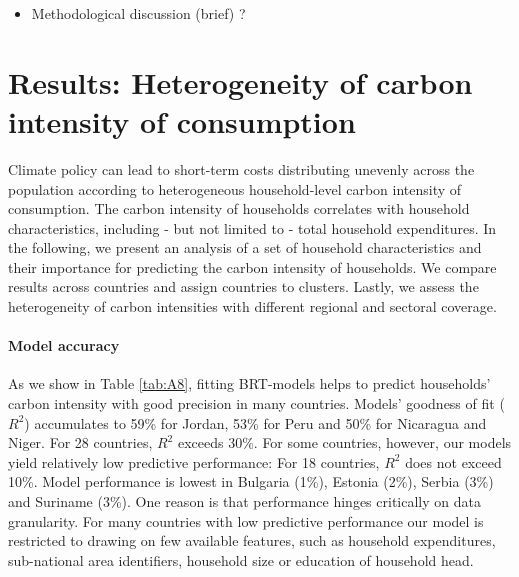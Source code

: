 \documentclass[12pt, a4paper]{article}
\begin{document}
\begin{itemize}
    \item Methodological discussion (brief) ?
\end{itemize}

\clearpage

\section{Results: Heterogeneity of carbon intensity of consumption} \label{sec:results}

Climate policy can lead to short-term costs distributing unevenly across the population according to heterogeneous household-level carbon intensity of consumption. The carbon intensity of households correlates with household characteristics, including - but not limited to - total household expenditures. In the following, we present an analysis of a set of household characteristics and their importance for predicting the carbon intensity of households. We compare results across countries and assign countries to clusters. Lastly, we assess the heterogeneity of carbon intensities with different regional and sectoral coverage.

\paragraph{Model accuracy} As we show in Table \ref{tab:A8}, fitting BRT-models helps to predict households' carbon intensity with good precision in many countries. Models' goodness of fit ($R^{2}$) accumulates to 59\% for Jordan, 53\% for Peru and 50\% for Nicaragua and Niger. For 28 countries, $R^{2}$ exceeds 30\%. For some countries, however, our models yield relatively low predictive performance: For 18 countries, $R^{2}$ does not exceed 10\%. Model performance is lowest in Bulgaria (1\%), Estonia (2\%), Serbia (3\%) and Suriname (3\%). One reason is that performance hinges critically on data granularity. For many countries with low predictive performance our model is restricted to drawing on few available features, such as household expenditures, sub-national area identifiers, household size or education of household head.
\end{document}
